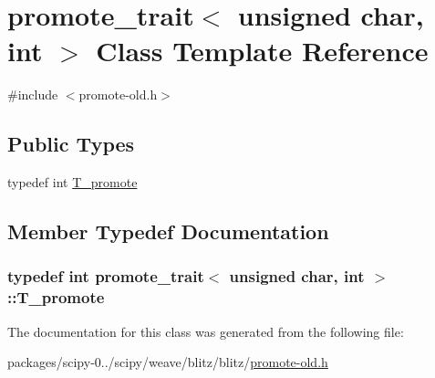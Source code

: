 \hypertarget{classpromote__trait_3_01unsigned_01char_00_01int_01_4}{}\section{promote\+\_\+trait$<$ unsigned char, int $>$ Class Template Reference}
\label{classpromote__trait_3_01unsigned_01char_00_01int_01_4}


{\ttfamily \#include $<$promote-\/old.\+h$>$}

\subsection*{Public Types}
\begin{DoxyCompactItemize}
\item 
typedef int \hyperlink{classpromote__trait_3_01unsigned_01char_00_01int_01_4_a17f60eac32fd7d2608bbcf586eb45f53}{T\+\_\+promote}
\end{DoxyCompactItemize}


\subsection{Member Typedef Documentation}
\hypertarget{classpromote__trait_3_01unsigned_01char_00_01int_01_4_a17f60eac32fd7d2608bbcf586eb45f53}{}
\subsubsection[{T\+\_\+promote}]{\setlength{\rightskip}{0pt plus 5cm}typedef int {\bf promote\+\_\+trait}$<$ unsigned char, int $>$\+::{\bf T\+\_\+promote}}\label{classpromote__trait_3_01unsigned_01char_00_01int_01_4_a17f60eac32fd7d2608bbcf586eb45f53}


The documentation for this class was generated from the following file\+:\begin{DoxyCompactItemize}
\item 
packages/scipy-\/0../scipy/weave/blitz/blitz/\hyperlink{promote-old_8h}{promote-\/old.\+h}\end{DoxyCompactItemize}
